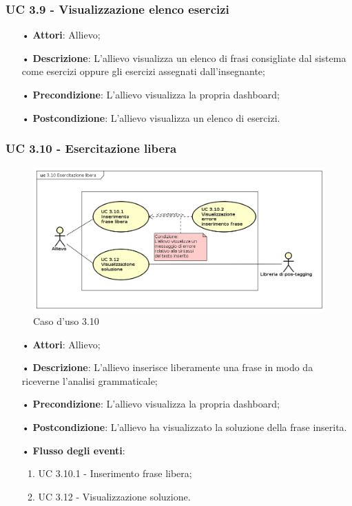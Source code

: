 \subsubsection{UC 3.9 - Visualizzazione elenco esercizi}
\begin{itemize}
\item[•]\textbf{Attori}: Allievo;
\item[•]\textbf{Descrizione}: L'allievo visualizza un elenco di frasi consigliate dal sistema come esercizi oppure gli esercizi assegnati dall'insegnante;
\item[•]\textbf{Precondizione}: L'allievo visualizza la propria dashboard;
\item[•]\textbf{Postcondizione}: L'allievo visualizza un elenco di esercizi.
\end{itemize}

\subsubsection{UC 3.10 - Esercitazione libera}
\begin{figure}[H]
	\centering
	\includegraphics[width=17cm]{img/UC310.png} 
	\caption{Caso d'uso 3.10}\label{fig:310}
\end{figure}
\begin{itemize}
\item[•]\textbf{Attori}: Allievo;
\item[•]\textbf{Descrizione}: L'allievo inserisce liberamente una frase in modo da riceverne l'analisi grammaticale;
\item[•]\textbf{Precondizione}: L'allievo visualizza la propria dashboard;
\item[•]\textbf{Postcondizione}: L'allievo ha visualizzato la soluzione della frase inserita.
\item[•]\textbf{Flusso degli eventi}:
\begin{enumerate}
	\item UC 3.10.1 - Inserimento frase libera;
	\item UC 3.12 - Visualizzazione soluzione.
\end{enumerate}
\end{itemize}

